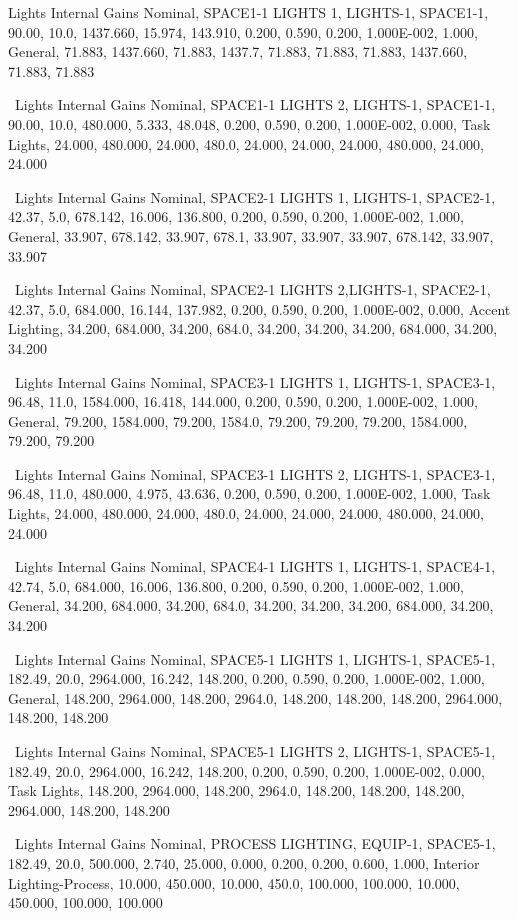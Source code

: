 Lights Internal Gains Nominal, SPACE1-1 LIGHTS 1, LIGHTS-1, SPACE1-1, 90.00, 10.0, 1437.660, 15.974, 143.910, 0.200, 0.590, 0.200, 1.000E-002, 1.000, General, 71.883, 1437.660, 71.883, 1437.7, 71.883, 71.883, 71.883, 1437.660, 71.883, 71.883

~Lights Internal Gains Nominal, SPACE1-1 LIGHTS 2, LIGHTS-1, SPACE1-1, 90.00, 10.0, 480.000, 5.333, 48.048, 0.200, 0.590, 0.200, 1.000E-002, 0.000, Task Lights, 24.000, 480.000, 24.000, 480.0, 24.000, 24.000, 24.000, 480.000, 24.000, 24.000

~Lights Internal Gains Nominal, SPACE2-1 LIGHTS 1, LIGHTS-1, SPACE2-1, 42.37, 5.0, 678.142, 16.006, 136.800, 0.200, 0.590, 0.200, 1.000E-002, 1.000, General, 33.907, 678.142, 33.907, 678.1, 33.907, 33.907, 33.907, 678.142, 33.907, 33.907

~Lights Internal Gains Nominal,  SPACE2-1 LIGHTS 2,LIGHTS-1, SPACE2-1, 42.37, 5.0, 684.000, 16.144, 137.982, 0.200, 0.590, 0.200, 1.000E-002, 0.000, Accent Lighting, 34.200, 684.000, 34.200, 684.0, 34.200, 34.200, 34.200, 684.000, 34.200, 34.200

~Lights Internal Gains Nominal, SPACE3-1 LIGHTS 1, LIGHTS-1, SPACE3-1, 96.48, 11.0, 1584.000, 16.418, 144.000, 0.200, 0.590, 0.200, 1.000E-002, 1.000, General, 79.200, 1584.000, 79.200, 1584.0, 79.200, 79.200, 79.200, 1584.000, 79.200, 79.200

~Lights Internal Gains Nominal, SPACE3-1 LIGHTS 2, LIGHTS-1, SPACE3-1, 96.48, 11.0, 480.000, 4.975, 43.636, 0.200, 0.590, 0.200, 1.000E-002, 1.000, Task Lights, 24.000, 480.000, 24.000, 480.0, 24.000, 24.000, 24.000, 480.000, 24.000, 24.000

~Lights Internal Gains Nominal, SPACE4-1 LIGHTS 1, LIGHTS-1, SPACE4-1, 42.74, 5.0, 684.000, 16.006, 136.800, 0.200, 0.590, 0.200, 1.000E-002, 1.000, General, 34.200, 684.000, 34.200, 684.0, 34.200, 34.200, 34.200, 684.000, 34.200, 34.200

~Lights Internal Gains Nominal, SPACE5-1 LIGHTS 1, LIGHTS-1, SPACE5-1, 182.49, 20.0, 2964.000, 16.242, 148.200, 0.200, 0.590, 0.200, 1.000E-002, 1.000, General, 148.200, 2964.000, 148.200, 2964.0, 148.200, 148.200, 148.200, 2964.000, 148.200, 148.200

~Lights Internal Gains Nominal, SPACE5-1 LIGHTS 2, LIGHTS-1, SPACE5-1, 182.49, 20.0, 2964.000, 16.242, 148.200, 0.200, 0.590, 0.200, 1.000E-002, 0.000, Task Lights, 148.200, 2964.000, 148.200, 2964.0, 148.200, 148.200, 148.200, 2964.000, 148.200, 148.200

~Lights Internal Gains Nominal, PROCESS LIGHTING, EQUIP-1, SPACE5-1, 182.49, 20.0, 500.000, 2.740, 25.000, 0.000, 0.200, 0.200, 0.600, 1.000, Interior Lighting-Process, 10.000, 450.000, 10.000, 450.0, 100.000, 100.000, 10.000, 450.000, 100.000, 100.000


